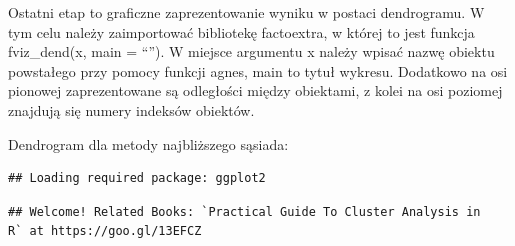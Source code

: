 \documentclass[12pt,a4paper]{report}
\begin{document}
{\begin{Shaded}
\begin{Highlighting}[]
\StringTok{ } \NormalTok{)}
\StringTok{ } \NormalTok{)}
\end{Highlighting}
\end{Shaded}

Ostatni etap to graficzne zaprezentowanie wyniku w postaci dendrogramu.
W tym celu należy zaimportować bibliotekę factoextra, w której to jest
funkcja fviz\_dend(x, main = ``''). W miejsce argumentu x należy wpisać
nazwę obiektu powstałego przy pomocy funkcji agnes, main to tytuł
wykresu. Dodatkowo na osi pionowej zaprezentowane są odległości między
obiektami, z kolei na osi poziomej znajdują się numery indeksów
obiektów.

Dendrogram dla metody najbliższego sąsiada:

\begin{Shaded}
\begin{Highlighting}[]
\end{Highlighting}
\end{Shaded}

\begin{verbatim}
## Loading required package: ggplot2
\end{verbatim}

\begin{verbatim}
## Welcome! Related Books: `Practical Guide To Cluster Analysis in 
R` at https://goo.gl/13EFCZ
\end{verbatim}

\begin{Shaded}
\begin{Highlighting}[]
\NormalTok{, }\NormalTok{, }
 \NormalTok{)}
\end{Highlighting}
\end{Shaded}

}
\end{document}
